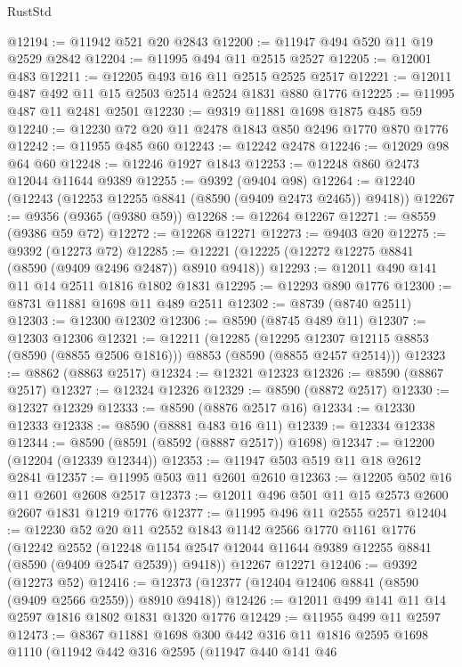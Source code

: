 \begin{lexlean}{RustStd}
\begin{coremodule}
@12194 := @11942 @521 @20 @2843
@12200 := @11947 @494 @520 @11 @19 @2529 @2842
@12204 := @11995 @494 @11 @2515 @2527
@12205 := @12001 @483
@12211 := @12205 @493 @16 @11 @2515 @2525 @2517
@12221 := @12011 @487 @492 @11 @15 @2503 @2514 @2524 @1831 @880 @1776
@12225 := @11995 @487 @11 @2481 @2501
@12230 := @9319 @11881 @1698 @1875 @485 @59
@12240 := @12230 @72 @20 @11 @2478 @1843 @850 @2496 @1770 @870 @1776
@12242 := @11955 @485 @60
@12243 := @12242 @2478
@12246 := @12029 @98 @64 @60
@12248 := @12246 @1927 @1843
@12253 := @12248 @860 @2473 @12044 @11644 @9389
@12255 := @9392 (@9404 @98)
@12264 := @12240 (@12243 (@12253 @12255 @8841 (@8590 (@9409 @2473 @2465)) @9418))
@12267 := @9356 (@9365 (@9380 @59))
@12268 := @12264 @12267
@12271 := @8559 (@9386 @59 @72)
@12272 := @12268 @12271
@12273 := @9403 @20
@12275 := @9392 (@12273 @72)
@12285 := @12221 (@12225 (@12272 @12275 @8841 (@8590 (@9409 @2496 @2487)) @8910 @9418))
@12293 := @12011 @490 @141 @11 @14 @2511 @1816 @1802 @1831
@12295 := @12293 @890 @1776
@12300 := @8731 @11881 @1698 @11 @489 @2511
@12302 := @8739 (@8740 @2511)
@12303 := @12300 @12302
@12306 := @8590 (@8745 @489 @11)
@12307 := @12303 @12306
@12321 := @12211
    (@12285
      (@12295 @12307 @12115 @8853 (@8590 (@8855 @2506 @1816)))
      @8853
      (@8590 (@8855 @2457 @2514)))
@12323 := @8862 (@8863 @2517)
@12324 := @12321 @12323
@12326 := @8590 (@8867 @2517)
@12327 := @12324 @12326
@12329 := @8590 (@8872 @2517)
@12330 := @12327 @12329
@12333 := @8590 (@8876 @2517 @16)
@12334 := @12330 @12333
@12338 := @8590 (@8881 @483 @16 @11)
@12339 := @12334 @12338
@12344 := @8590 (@8591 (@8592 (@8887 @2517)) @1698)
@12347 := @12200 (@12204 (@12339 @12344))
@12353 := @11947 @503 @519 @11 @18 @2612 @2841
@12357 := @11995 @503 @11 @2601 @2610
@12363 := @12205 @502 @16 @11 @2601 @2608 @2517
@12373 := @12011 @496 @501 @11 @15 @2573 @2600 @2607 @1831 @1219 @1776
@12377 := @11995 @496 @11 @2555 @2571
@12404 := @12230
    @52
    @20
    @11
    @2552
    @1843
    @1142
    @2566
    @1770
    @1161
    @1776
    (@12242
      @2552
      (@12248 @1154 @2547 @12044 @11644 @9389 @12255 @8841 (@8590 (@9409 @2547 @2539)) @9418))
    @12267
    @12271
@12406 := @9392 (@12273 @52)
@12416 := @12373 (@12377 (@12404 @12406 @8841 (@8590 (@9409 @2566 @2559)) @8910 @9418))
@12426 := @12011 @499 @141 @11 @14 @2597 @1816 @1802 @1831 @1320 @1776
@12429 := @11955 @499 @11 @2597
@12473 := @8367
    @11881
    @1698
    @300
    @442
    @316
    @11
    @1816
    @2595
    @1698
    @1110
    (@11942
      @442
      @316
      @2595
      (@11947
        @440
        @141
        @46

\end{coremodule}
\end{lexlean}
